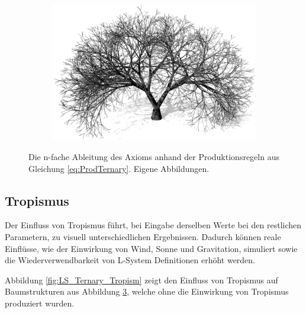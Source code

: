 \begin{figure} [hbtp]
\begin{subfigure}[t]{.45\textwidth}
		\caption{}
		\label{subfig:LS_Ternary_3}
	\end{subfigure}
	\begin{subfigure}[t]{.45\textwidth}
		\centering
		\includegraphics[width=\linewidth]{images/LS_Ternary_4.png}
		\caption{}
		\label{subfig:LS_Ternary_4}
	\end{subfigure}
	\caption{Die n-fache Ableitung des Axioms anhand der Produktionsregeln aus Gleichung \ref{eq:ProdTernary}. Eigene Abbildungen.}
	\label{fig:LS_Ternary}
\end{figure}


\subsection{Tropismus}

Der Einfluss von Tropismus führt, bei Eingabe derselben Werte bei den restlichen Parametern, zu visuell unterschiedlichen Ergebnissen. Dadurch können reale Einflüsse, wie der Einwirkung von Wind, Sonne und Gravitation, simuliert sowie die Wiederverwendbarkeit von L-System Definitionen erhöht werden. 

Abbildung \ref{fig:LS_Ternary_Tropism} zeigt den Einfluss von Tropismus auf Baumstrukturen aus Abbildung \ref{fig:LS_Ternary}, welche ohne die Einwirkung von Tropismus produziert wurden.


